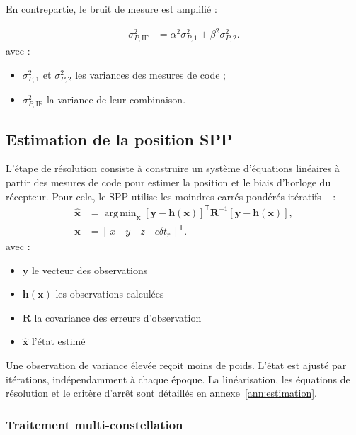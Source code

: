 En contrepartie, le bruit de mesure est amplifié :

\begin{align}
\sigma_{P,\mathrm{IF}}^2&=\alpha^2\sigma_{P,1}^2+\beta^2\sigma_{P,2}^2.
\label{new:if_variance}
\end{align}
avec :
\begin{itemize}
\item $\sigma_{P,1}^2$ et $\sigma_{P,2}^2$ les variances des mesures de code ;
\item $\sigma_{P,\mathrm{IF}}^2$ la variance de leur combinaison.
\end{itemize}

\subsection{Estimation de la position SPP}

L'étape de résolution consiste à construire un système d'équations linéaires à partir des mesures de code 
pour estimer la position et le biais d'horloge du récepteur.
Pour cela, 
le SPP utilise les moindres carrés pondérés itératifs ~\cite{verhagen2017least} :
\begin{align}
\widehat{\mathbf x}
&=\mathop{\mathrm{arg\,min}}_{\mathbf x}
[\mathbf y-\mathbf h(\mathbf x)]^{\mathsf T}\mathbf R^{-1}
[\mathbf y-\mathbf h(\mathbf x)],\\
\mathbf x&=[\,x\quad y\quad z\quad c\delta t_r\,]^{\mathsf T}.
\label{new:wls}
\end{align}
avec :
\begin{itemize}
\item $\mathbf y$ le vecteur des observations 
\item $\mathbf h(\mathbf x)$ les observations calculées 
\item $\mathbf R$ la covariance des erreurs d'observation 
\item $\widehat{\mathbf x}$ l'état estimé
\end{itemize}

Une observation de variance élevée reçoit moins de poids. L'état est ajusté
par itérations, indépendamment à chaque époque. La linéarisation, les
équations de résolution et le critère d'arrêt sont détaillés en
annexe~\ref{ann:estimation}.

\subsubsection{Traitement multi-constellation}

